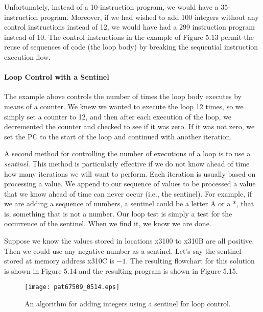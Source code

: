 \documentclass{patt}
\begin{document}
Unfortunately, instead of a 10-instruction program, we would have 
a 35-instruction program.  Moreover, if we had wished to add 100
integers without any control instructions instead of 12, we would have
had a 299 instruction program instead of 10.  The control instructions
in the example of Figure 5.13 permit the reuse of sequences of code 
(the loop body) by breaking the sequential instruction execution flow.

\FloatBarrier
\paragraph{Loop Control with a Sentinel}

The example above controls the number of times the loop body executes
by means of a counter.  \lightbulb[-10pt] 
We knew we wanted to execute the loop 12 times, so we
simply set a counter to 12, and then after each execution of the loop, we
decremented the counter and checked to see if it was zero. If it was not
zero, we set the PC to the start of the loop and continued with another
iteration.

A second method for controlling the number of executions of a loop is
to use a {\em sentinel}.  This method is particularly effective if we
do not know  ahead of time how many
iterations we will want to perform.  Each iteration is usually based
on processing a value.  We append to our sequence of values to be
processed a value that we know ahead of time can never occur (i.e.,
the sentinel).  For example, if we are adding a sequence of numbers, a
sentinel could be a letter A or a *, that is, something that is not a
number.  Our loop test is simply a test for the occurrence of the
sentinel.  When we find it, we know we are done.

Suppose we know the values
stored in locations x3100 to x310B are all positive.  Then we could
use any negative number as a sentinel.  Let's say the sentinel stored
at memory address x310C is $-1$.  The resulting flowchart for this
solution is shown in Figure 5.14 and the resulting program is shown 
in Figure 5.15.

\begin{figure}
\centerline{\texttt{[image: pat67509\_0514.eps]}}
\caption{An algorithm for adding integers using a sentinel for loop control.}
\label{fig:sentinel}
\vspace{12pt}
\end{figure}
\end{document}
